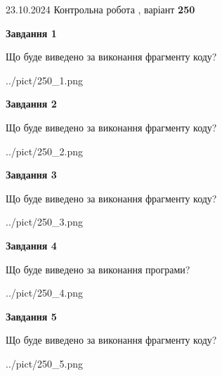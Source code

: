 \documentclass[12pt, ukrainian]{article}
\begin{document}
{\Large{23.10.2024 Контрольна робота , варіант  \No \textbf { 250 }\par}}
{
\begin {large}
{\begin {center}\textbf{Завдання 1}\end {center}}

Що буде виведено за виконання фрагменту коду?\par
\begin{center}
	{../pict/250_1.png}
\end{center}
\newpage

{\begin {center}\textbf{Завдання 2}\end {center}}

Що буде виведено за виконання фрагменту коду?\par
\begin{center}
	{../pict/250_2.png}
\end{center}
\newpage

{\begin {center}\textbf{Завдання 3}\end {center}}

Що буде виведено за виконання фрагменту коду?\par
\begin{center}
	{../pict/250_3.png}
\end{center}
\newpage

{\begin {center}\textbf{Завдання 4}\end {center}}

Що буде виведено за виконання програми?\par
\begin{center}
	{../pict/250_4.png}
\end{center}
\newpage

{\begin {center}\textbf{Завдання 5}\end {center}}

Що буде виведено за виконання фрагменту коду?\par
\begin{center}
	{../pict/250_5.png}
\end{center}
\newpage


\end{large}}
\end{document}
